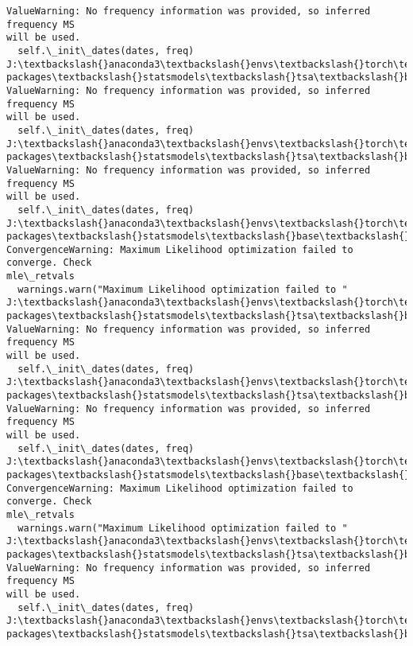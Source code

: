 \documentclass[11pt]{article}
\begin{document}
\begin{Verbatim}[commandchars=\\\{\}]
ValueWarning: No frequency information was provided, so inferred frequency MS
will be used.
  self.\_init\_dates(dates, freq)
J:\textbackslash{}anaconda3\textbackslash{}envs\textbackslash{}torch\textbackslash{}Lib\textbackslash{}site-packages\textbackslash{}statsmodels\textbackslash{}tsa\textbackslash{}base\textbackslash{}tsa\_model.py:473:
ValueWarning: No frequency information was provided, so inferred frequency MS
will be used.
  self.\_init\_dates(dates, freq)
J:\textbackslash{}anaconda3\textbackslash{}envs\textbackslash{}torch\textbackslash{}Lib\textbackslash{}site-packages\textbackslash{}statsmodels\textbackslash{}tsa\textbackslash{}base\textbackslash{}tsa\_model.py:473:
ValueWarning: No frequency information was provided, so inferred frequency MS
will be used.
  self.\_init\_dates(dates, freq)
J:\textbackslash{}anaconda3\textbackslash{}envs\textbackslash{}torch\textbackslash{}Lib\textbackslash{}site-packages\textbackslash{}statsmodels\textbackslash{}base\textbackslash{}model.py:607:
ConvergenceWarning: Maximum Likelihood optimization failed to converge. Check
mle\_retvals
  warnings.warn("Maximum Likelihood optimization failed to "
J:\textbackslash{}anaconda3\textbackslash{}envs\textbackslash{}torch\textbackslash{}Lib\textbackslash{}site-packages\textbackslash{}statsmodels\textbackslash{}tsa\textbackslash{}base\textbackslash{}tsa\_model.py:473:
ValueWarning: No frequency information was provided, so inferred frequency MS
will be used.
  self.\_init\_dates(dates, freq)
J:\textbackslash{}anaconda3\textbackslash{}envs\textbackslash{}torch\textbackslash{}Lib\textbackslash{}site-packages\textbackslash{}statsmodels\textbackslash{}tsa\textbackslash{}base\textbackslash{}tsa\_model.py:473:
ValueWarning: No frequency information was provided, so inferred frequency MS
will be used.
  self.\_init\_dates(dates, freq)
J:\textbackslash{}anaconda3\textbackslash{}envs\textbackslash{}torch\textbackslash{}Lib\textbackslash{}site-packages\textbackslash{}statsmodels\textbackslash{}base\textbackslash{}model.py:607:
ConvergenceWarning: Maximum Likelihood optimization failed to converge. Check
mle\_retvals
  warnings.warn("Maximum Likelihood optimization failed to "
J:\textbackslash{}anaconda3\textbackslash{}envs\textbackslash{}torch\textbackslash{}Lib\textbackslash{}site-packages\textbackslash{}statsmodels\textbackslash{}tsa\textbackslash{}base\textbackslash{}tsa\_model.py:473:
ValueWarning: No frequency information was provided, so inferred frequency MS
will be used.
  self.\_init\_dates(dates, freq)
J:\textbackslash{}anaconda3\textbackslash{}envs\textbackslash{}torch\textbackslash{}Lib\textbackslash{}site-packages\textbackslash{}statsmodels\textbackslash{}tsa\textbackslash{}base\textbackslash{}tsa\_model.py:473:

\end{Verbatim}
\end{document}
